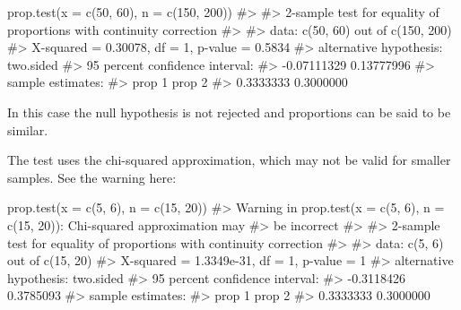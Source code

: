 \documentclass[
  letterpaper,
  DIV=11,
  numbers=noendperiod]{scrreprt}
\newenvironment{Shaded}{\begin{snugshade}}{\end{snugshade}}
\newcommand{\AttributeTok}[1]{\textcolor[rgb]{0.40,0.45,0.13}{#1}}
\newcommand{\CommentTok}[1]{\textcolor[rgb]{0.37,0.37,0.37}{#1}}
\newcommand{\DecValTok}[1]{\textcolor[rgb]{0.68,0.00,0.00}{#1}}
\newcommand{\FunctionTok}[1]{\textcolor[rgb]{0.28,0.35,0.67}{#1}}
\newcommand{\NormalTok}[1]{\textcolor[rgb]{0.00,0.23,0.31}{#1}}
\begin{document}
\begin{Shaded}
\begin{Highlighting}[]
\FunctionTok{prop.test}\NormalTok{(}\AttributeTok{x =} \FunctionTok{c}\NormalTok{(}\DecValTok{50}\NormalTok{, }\DecValTok{60}\NormalTok{), }\AttributeTok{n =} \FunctionTok{c}\NormalTok{(}\DecValTok{150}\NormalTok{, }\DecValTok{200}\NormalTok{))}
\CommentTok{\#\textgreater{} }
\CommentTok{\#\textgreater{}  2{-}sample test for equality of proportions with continuity correction}
\CommentTok{\#\textgreater{} }
\CommentTok{\#\textgreater{} data:  c(50, 60) out of c(150, 200)}
\CommentTok{\#\textgreater{} X{-}squared = 0.30078, df = 1, p{-}value = 0.5834}
\CommentTok{\#\textgreater{} alternative hypothesis: two.sided}
\CommentTok{\#\textgreater{} 95 percent confidence interval:}
\CommentTok{\#\textgreater{}  {-}0.07111329  0.13777996}
\CommentTok{\#\textgreater{} sample estimates:}
\CommentTok{\#\textgreater{}    prop 1    prop 2 }
\CommentTok{\#\textgreater{} 0.3333333 0.3000000}
\end{Highlighting}
\end{Shaded}

In this case the null hypothesis is not rejected and proportions can be
said to be similar.

The test uses the chi-squared approximation, which may not be valid for
smaller samples. See the warning here:

\begin{Shaded}
\begin{Highlighting}[]
\FunctionTok{prop.test}\NormalTok{(}\AttributeTok{x =} \FunctionTok{c}\NormalTok{(}\DecValTok{5}\NormalTok{, }\DecValTok{6}\NormalTok{), }\AttributeTok{n =} \FunctionTok{c}\NormalTok{(}\DecValTok{15}\NormalTok{, }\DecValTok{20}\NormalTok{))}
\CommentTok{\#\textgreater{} Warning in prop.test(x = c(5, 6), n = c(15, 20)): Chi{-}squared approximation may}
\CommentTok{\#\textgreater{} be incorrect}
\CommentTok{\#\textgreater{} }
\CommentTok{\#\textgreater{}  2{-}sample test for equality of proportions with continuity correction}
\CommentTok{\#\textgreater{} }
\CommentTok{\#\textgreater{} data:  c(5, 6) out of c(15, 20)}
\CommentTok{\#\textgreater{} X{-}squared = 1.3349e{-}31, df = 1, p{-}value = 1}
\CommentTok{\#\textgreater{} alternative hypothesis: two.sided}
\CommentTok{\#\textgreater{} 95 percent confidence interval:}
\CommentTok{\#\textgreater{}  {-}0.3118426  0.3785093}
\CommentTok{\#\textgreater{} sample estimates:}
\CommentTok{\#\textgreater{}    prop 1    prop 2 }
\CommentTok{\#\textgreater{} 0.3333333 0.3000000}
\end{Highlighting}
\end{Shaded}
\end{document}
